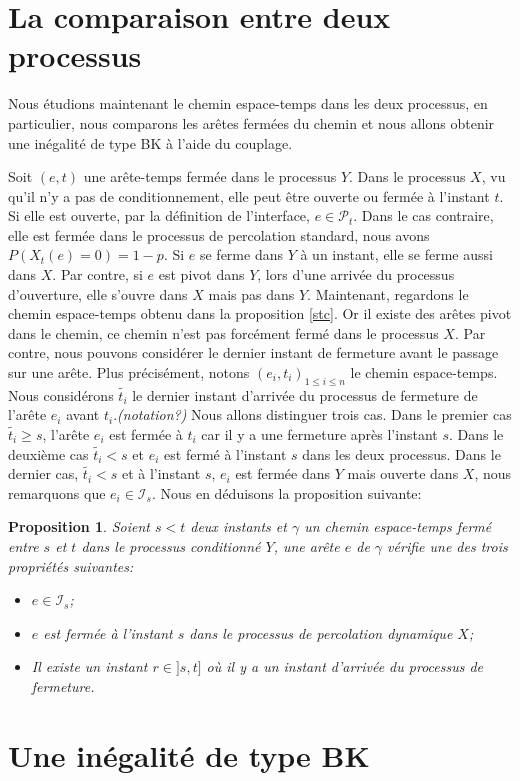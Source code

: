 \documentclass[titlepage,a4paper,12pt]{article}
\newcounter{prop}
\newtheorem{propo}[prop]{Proposition}
\begin{document}
\section{La comparaison entre deux processus}
Nous étudions maintenant le chemin espace-temps dans les deux processus, en particulier, nous comparons les arêtes fermées du chemin et nous allons obtenir une inégalité de type BK à l'aide du couplage.

Soit $(e,t)$ une arête-temps fermée dans le processus $Y$. Dans le processus $X$, vu qu'il n'y a pas de conditionnement, elle peut être ouverte ou fermée à l'instant $t$. Si elle est ouverte, par la définition de l'interface, $e\in \mathcal{P}_t$. Dans le cas contraire, elle est fermée dans le processus de percolation standard, nous avons $P(X_t(e) = 0) = 1-p$. Si $e$ se ferme dans $Y$ à un instant, elle se ferme aussi dans $X$. Par contre, si $e$ est pivot dans $Y$, lors d'une arrivée du processus d'ouverture, elle s'ouvre dans $X$ mais pas dans $Y$. Maintenant, regardons le chemin espace-temps obtenu dans la proposition \ref{stc}. Or il existe des arêtes pivot dans le chemin, ce chemin n'est pas forcément fermé dans le processus $X$. Par contre, nous pouvons considérer le dernier instant de fermeture avant le passage sur une arête. Plus précisément, notons $(e_i,t_i)_{1\leqslant i \leqslant n}$ le chemin espace-temps. Nous considérons $\tilde{t_i}$ le dernier instant d'arrivée du processus de fermeture de l'arête $e_i$ avant $t_i$.\emph{\color{blue}(notation?)} Nous allons distinguer trois cas. Dans le premier cas $\tilde{t_i}\geqslant s$, l'arête $e_i$ est fermée à $t_i$ car il y a une fermeture après l'instant $s$. Dans le deuxième cas $\tilde{t_i}< s$ et $e_i$ est fermé à l'instant $s$ dans les deux processus. Dans le dernier cas, $\tilde{t_i}< s$ et à l'instant $s$, $e_i$ est fermée dans $Y$ mais ouverte dans $X$, nous remarquons que $e_i \in \mathcal{I}_s$. Nous en déduisons la proposition suivante:

\begin{propo} Soient $s<t$ deux instants et $\gamma$ un chemin espace-temps fermé entre $s$ et $t$ dans le processus conditionné $Y$, une arête $e$ de $\gamma$ vérifie une des trois propriétés suivantes:
\begin{itemize}[leftmargin = *]
\item $e\in \mathcal{I}_s$;
\item $e$ est fermée à l'instant $s$ dans le processus de percolation dynamique $X$;
\item Il existe un instant $r\in ]s,t]$ où il y a un instant d'arrivée du processus de fermeture.
\end{itemize}
\end{propo}

\section{Une inégalité de type BK}
\end{document}
